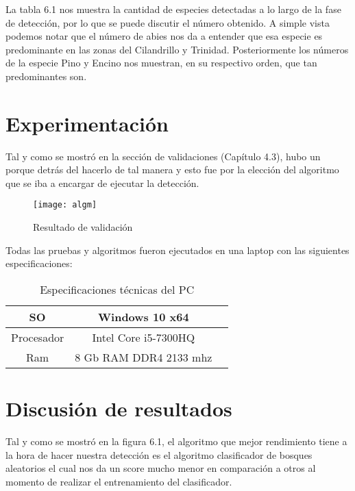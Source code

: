La tabla 6.1 nos muestra la cantidad de especies detectadas a lo largo de la fase de detección, por lo que se puede discutir el número obtenido. A simple vista podemos notar que el número de abies nos da a entender que esa especie es predominante en las zonas del Cilandrillo y Trinidad. Posteriormente los números de la especie Pino y Encino nos muestran, en su respectivo orden, que tan predominantes son.

\section{Experimentación}
Tal y como se mostró en la sección de validaciones (Capítulo 4.3), hubo un porque detrás del hacerlo de tal manera y esto fue por la elección del algoritmo que se iba a encargar de ejecutar la detección.


\begin{figure}[H]
  \centering
  \begin{minipage}[b]{0.8\textwidth}
        \texttt{[image: algm]}
    \caption{Resultado de validación}
  \end{minipage}
\end{figure}


Todas las pruebas y algoritmos fueron ejecutados en una laptop con las siguientes especificaciones:

\begin{table}[H]
	{\centering
		\begin{tabular}{|c|c|c|}
			\hline
			SO & Windows 10 x64\\
			\hline
			Procesador & Intel Core i5-7300HQ\\
			\hline
			Ram & 8 Gb RAM DDR4 2133 mhz\\
			\hline
		\end{tabular}
	\caption{Especificaciones técnicas del PC}
	\label{tab:Especificaciones técnicas del PC}
	}
\end{table}

\break

\section{Discusión de resultados}
Tal y como se mostró en la figura 6.1, el algoritmo que mejor rendimiento tiene a la hora de hacer nuestra detección es el algoritmo clasificador de bosques aleatorios el cual nos da un score mucho menor en comparación a otros al momento de realizar el entrenamiento del clasificador.

